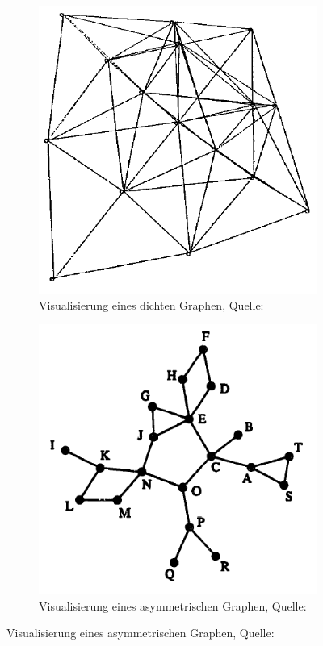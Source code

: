 \documentclass[12pt, a4paper]{article}
\begin{document}
\begin{figure}[h!]
\centering
\begin{subfigure}[b]{0.45\textwidth}
\includegraphics[width=\textwidth]{Eades_dense.png}
\caption[Visualisierung eines dichten Graphen]{Visualisierung eines dichten Graphen, Quelle: \protect{}}
\label{Eades_dense}
\end{subfigure}
\begin{subfigure}[b]{0.45\textwidth}
\includegraphics[width=\textwidth]{kamada_kawai_asymmetric_graph.png}
\caption[Visualisierung eines asymmetrischen Graphen]{Visualisierung eines asymmetrischen Graphen, Quelle: \protect{}}
\label{kamada_kawai_asymmetric_graph}
\end{subfigure}


\end{figure}
\end{document}
